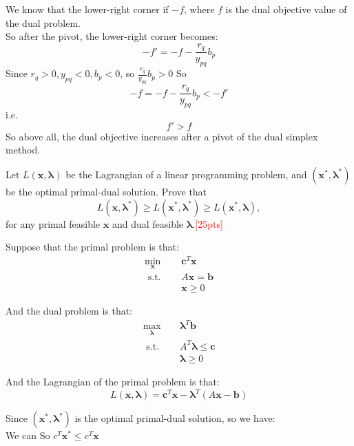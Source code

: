 \documentclass[10pt]{article}
\newenvironment{problem}[2][Problem]{\begin{trivlist}
\item[\hskip \labelsep {\bfseries #1}\hskip \labelsep {\bfseries #2.}]}{\end{trivlist}}
\begin{document}
We know that the lower-right corner if $-f$, where $f$ is the dual objective value of the dual problem.\\
So after the pivot, the lower-right corner becomes:\\
$$-f'= -f - \frac{r_q}{y_{pq}}b_p$$
Since $r_q>0,y_{pq}<0,b_p<0$, so $\frac{r_q}{y_{pq}}b_p>0$
So
$$-f= -f - \frac{r_q}{y_{pq}}b_p < -f'$$
i.e.
$$f'>f$$
So above all, the dual objective increases after a pivot of the dual simplex method.\\

\newpage


\begin{problem}{3}
    Let $L(\bm{x}, \bm{\lambda})$ be the Lagrangian of a linear programming problem, and $(\bm{x}^*, \bm{\lambda}^*)$ be the optimal primal-dual solution. Prove that $$L(\bm{x}, \bm{\lambda}^*) \geq L(\bm{x}^*, \bm{\lambda}^*) \geq L(\bm{x}^*, \bm{\lambda}),$$ for any primal feasible $\bm{x}$ and dual feasible $\bm{\lambda}$.\textcolor{red}{[25pts]}
\end{problem}

Suppose that the primal problem is that:
\begin{equation}
\begin{aligned}
\min_{\bm{x}} \quad & \bm{c}^T\bm{x} \\
\text { s.t. } \quad & A\bm{x} = \bm{b} \\
& \bm{x} \geq 0
\end{aligned}
\end{equation}

And the dual problem is that:
\begin{equation}
\begin{aligned}
\max_{\bm{\lambda}} \quad & \bm{\lambda}^T\bm{b} \\
\text { s.t. } \quad & A^T\bm{\lambda} \leq \bm{c} \\
& \bm{\lambda} \geq 0
\end{aligned}
\end{equation}

And the Lagrangian of the primal problem is that:
$$L(\bm{x},\bm{\lambda}) = \bm{c}^T\bm{x} - \bm{\lambda}^T(A\bm{x} - \bm{b})$$

Since $(\bm{x}^*, \bm{\lambda}^*)$ is the optimal primal-dual solution, so we have:\\
We can 
So $c^T\bm{x}^*\leq c^T\bm{x}$
\end{document}
